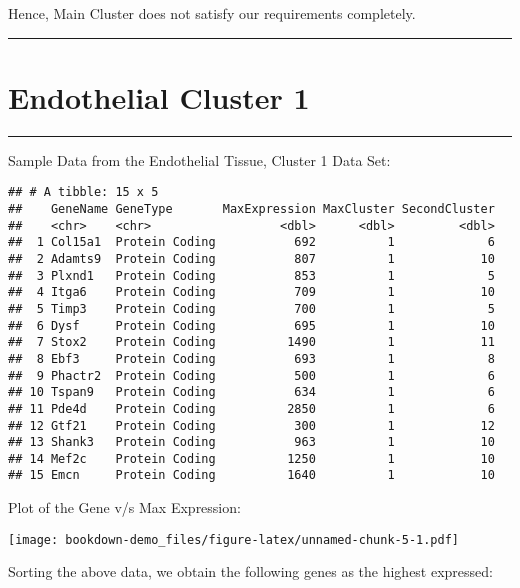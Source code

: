 \documentclass[
]{book}
\begin{document}
Hence, Main Cluster does not satisfy our requirements completely.

\begin{center}\rule{0.5\linewidth}{0.5pt}\end{center}

\hypertarget{endothelial-cluster-1}{%
\chapter{Endothelial Cluster 1}\label{endothelial-cluster-1}}

\begin{center}\rule{0.5\linewidth}{0.5pt}\end{center}

Sample Data from the Endothelial Tissue, Cluster 1 Data Set:

\begin{verbatim}
## # A tibble: 15 x 5
##    GeneName GeneType       MaxExpression MaxCluster SecondCluster
##    <chr>    <chr>                  <dbl>      <dbl>         <dbl>
##  1 Col15a1  Protein Coding           692          1             6
##  2 Adamts9  Protein Coding           807          1            10
##  3 Plxnd1   Protein Coding           853          1             5
##  4 Itga6    Protein Coding           709          1            10
##  5 Timp3    Protein Coding           700          1             5
##  6 Dysf     Protein Coding           695          1            10
##  7 Stox2    Protein Coding          1490          1            11
##  8 Ebf3     Protein Coding           693          1             8
##  9 Phactr2  Protein Coding           500          1             6
## 10 Tspan9   Protein Coding           634          1             6
## 11 Pde4d    Protein Coding          2850          1             6
## 12 Gtf21    Protein Coding           300          1            12
## 13 Shank3   Protein Coding           963          1            10
## 14 Mef2c    Protein Coding          1250          1            10
## 15 Emcn     Protein Coding          1640          1            10
\end{verbatim}

Plot of the Gene v/s Max Expression:

\texttt{[image: bookdown-demo\_files/figure-latex/unnamed-chunk-5-1.pdf]}

Sorting the above data, we obtain the following genes as the highest expressed:
\end{document}
